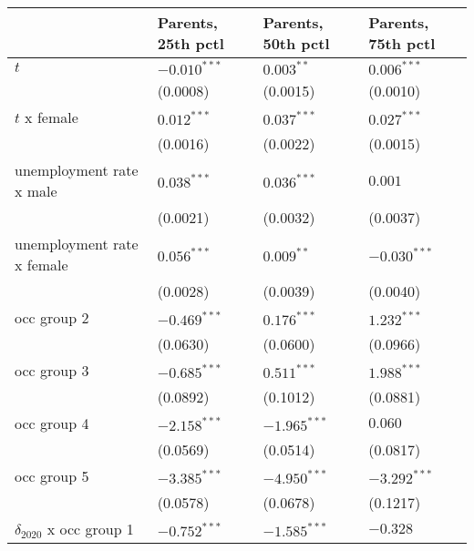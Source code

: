 \begin{tabular}{llll}
\toprule
{} & Parents, 25th pctl & Parents, 50th pctl & Parents, 75th pctl \\
\midrule
$t$                                    &     $-0.010^{***}$ &       $0.003^{**}$ &      $0.006^{***}$ \\
                                       &           (0.0008) &           (0.0015) &           (0.0010) \\
$t$ x female                           &      $0.012^{***}$ &      $0.037^{***}$ &      $0.027^{***}$ \\
                                       &           (0.0016) &           (0.0022) &           (0.0015) \\
unemployment rate x male               &      $0.038^{***}$ &      $0.036^{***}$ &            $0.001$ \\
                                       &           (0.0021) &           (0.0032) &           (0.0037) \\
unemployment rate x female             &      $0.056^{***}$ &       $0.009^{**}$ &     $-0.030^{***}$ \\
                                       &           (0.0028) &           (0.0039) &           (0.0040) \\
occ group 2                            &     $-0.469^{***}$ &      $0.176^{***}$ &      $1.232^{***}$ \\
                                       &           (0.0630) &           (0.0600) &           (0.0966) \\
occ group 3                            &     $-0.685^{***}$ &      $0.511^{***}$ &      $1.988^{***}$ \\
                                       &           (0.0892) &           (0.1012) &           (0.0881) \\
occ group 4                            &     $-2.158^{***}$ &     $-1.965^{***}$ &            $0.060$ \\
                                       &           (0.0569) &           (0.0514) &           (0.0817) \\
occ group 5                            &     $-3.385^{***}$ &     $-4.950^{***}$ &     $-3.292^{***}$ \\
                                       &           (0.0578) &           (0.0678) &           (0.1217) \\
$\delta_{2020}$ x occ group 1          &     $-0.752^{***}$ &     $-1.585^{***}$ &           $-0.328$ \\

\end{tabular}

